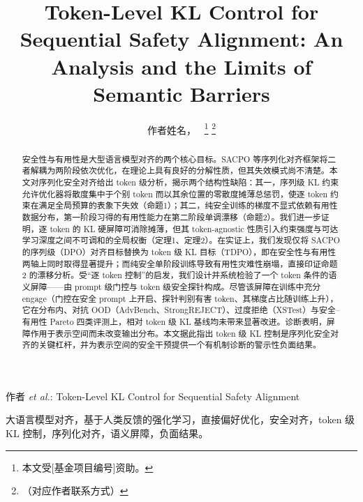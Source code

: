 \documentclass[lettersize,journal]{IEEEtran}
\begin{document}
\title{Token-Level KL Control for Sequential Safety Alignment: An Analysis and the Limits of Semantic Barriers}

\author{作者姓名，~
\thanks{本文受[基金项目编号]资助。}%
\thanks{（对应作者联系方式）}}

%
{作者 \MakeLowercase{\textit{et al.}}: Token-Level KL Control for Sequential Safety Alignment}

\IEEEpubid{}

\maketitle

\begin{abstract}
安全性与有用性是大型语言模型对齐的两个核心目标。SACPO 等序列化对齐框架将二者解耦为两阶段依次优化，在理论上具有良好的分解性质，但其失效模式尚不清楚。本文对序列化安全对齐给出 token 级分析，揭示两个结构性缺陷：其一，序列级 KL 约束允许优化器将散度集中于个别 token 而以其余位置的零散度摊薄总惩罚，使逐 token 约束在满足全局预算的表象下失效（命题1）；其二，纯安全训练的梯度不显式依赖有用性数据分布，第一阶段习得的有用性能力在第二阶段单调漂移（命题2）。我们进一步证明，逐 token 的 KL 硬屏障可消除摊薄，但其 token-agnostic 性质引入约束强度与可达学习深度之间不可调和的全局权衡（定理1、定理2）。在实证上，我们发现仅将 SACPO 的序列级（DPO）对齐目标替换为 token 级 KL 目标（TDPO），即在安全性与有用性两轴上同时取得显著提升；而纯安全单阶段训练导致有用性灾难性崩塌，直接印证命题2 的漂移分析。受“逐 token 控制”的启发，我们设计并系统检验了一个 token 条件的语义屏障——由 prompt 级门控与 token 级安全探针构成。尽管该屏障在训练中充分 engage（门控在安全 prompt 上开启、探针判别有害 token、其梯度占比随训练上升），它在分布内、对抗 OOD（AdvBench、StrongREJECT）、过度拒绝（XSTest）与安全–有用性 Pareto 四类评测上，相对 token 级 KL 基线均未带来显著改进。诊断表明，屏障作用于表示空间而未改变输出分布。本文据此指出 token 级 KL 控制是序列化安全对齐的关键杠杆，并为表示空间的安全干预提供一个有机制诊断的警示性负面结果。
\end{abstract}


\begin{IEEEkeywords}
大语言模型对齐，基于人类反馈的强化学习，直接偏好优化，安全对齐，token 级 KL 控制，序列化对齐，语义屏障，负面结果。
\end{IEEEkeywords}
\end{document}

